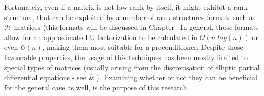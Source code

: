 Fortunately, even if a matrix is not low-rank by itself, it might exhibit a rank structure, that can be exploited by a number of rank-structures formats such as $\mathcal{H}$-matrices (this formats will be discussed in Chapter~%
In general, those formats allow for an approximate LU factorization to be calculated in $\mathcal{O}(n \;log(n))$ or even $\mathcal{O}(n)$, making them most suitable for a preconditioner. Despite those favourable properties, the usage of this techniques has been mostly limited to special types of matrices (usually arising from the discretisation of elliptic partial differential equations - see \cite{gatto_preconditioner_2015} \& \cite{gatto_efficient_2017}). Examining whether or not they can be beneficial for the general case as well, is the purpose of this research.